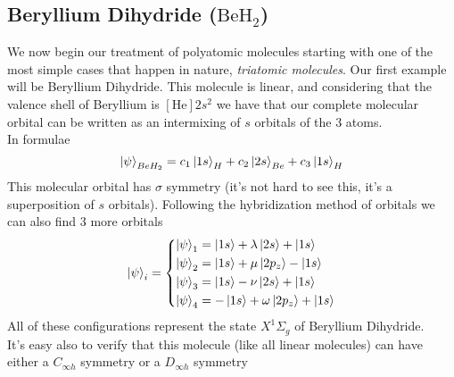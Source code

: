 \documentclass[../qm.tex]{subfiles}
\begin{document}
	\subsection{Beryllium Dihydride ($\mathrm{BeH_2}$)}
	We now begin our treatment of polyatomic molecules starting with one of the most simple cases that happen in nature, \textit{triatomic molecules}. Our first example will be Beryllium Dihydride. This molecule is linear, and considering that the valence shell of Beryllium is $[\mathrm{He}]2s^2$ we have that our complete molecular orbital can be written as an intermixing of $s$ orbitals of the 3 atoms.\\
	In formulae
	\begin{equation}
		\ket{\psi}_{BeH_2}=c_1\ket{1s}_H+c_2\ket{2s}_{Be}+c_3\ket{1s}_H
		\label{eq:psibeh2}
	\end{equation}
	This molecular orbital has $\sigma$ symmetry (it's not hard to see this, it's a superposition of $s$ orbitals). Following the hybridization method of orbitals we can also find 3 more orbitals
	\begin{equation}
		\ket{\psi}_i=\left\{\begin{aligned}
			\ket{\psi}_1&=\ket{1s}+\lambda\ket{2s}+\ket{1s}\\
			\ket{\psi}_2&=\ket{1s}+\mu\ket{2p_z}-\ket{1s}\\
			\ket{\psi}_3&=\ket{1s}-\nu\ket{2s}+\ket{1s}\\
			\ket{\psi}_4&=-\ket{1s}+\omega\ket{2p_z}+\ket{1s}
		\end{aligned}\right.
		\label{eq:beh2orbitals}
	\end{equation}
	All of these configurations represent the state $X^1\Sigma_g$ of Beryllium Dihydride.\\
	It's easy also to verify that this molecule (like all linear molecules) can have either a $C_{\infty h}$ symmetry or a $D_{\infty h}$ symmetry
\end{document}
